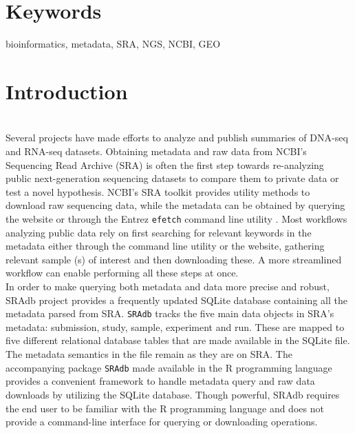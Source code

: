 \documentclass[9pt,a4paper]{extarticle}
\begin{document}
\section*{Keywords}
bioinformatics, metadata, SRA, NGS, NCBI, GEO



\clearpage
\pagestyle{main}
\section*{Introduction}
~\\
Several projects have made efforts to analyze and publish summaries of DNA-seq \cite{macarthur2012systematic} and RNA-seq
\cite{lachmann2018massive, collado2017reproducible} datasets. Obtaining metadata
and raw data from NCBI's Sequencing Read Archive (SRA) \cite{leinonen2010sequence}
is often the first step towards re-analyzing public next-generation sequencing 
datasets to compare them to private data or test a novel hypothesis. NCBI's SRA
toolkit \cite{ncbisratoolit} provides utility methods to download raw sequencing
data, while the metadata can be obtained by querying the website or through the
Entrez \texttt{efetch} command line utility \cite{kans2018entrez}. Most workflows analyzing
public data rely on first searching for relevant keywords in the metadata either
through the command line utility or the website, gathering relevant sample (s) of interest and then downloading these. A
more streamlined workflow can enable performing all these steps at once.
~\\

In order to make querying both metadata and data more precise and robust, SRAdb
\cite{zhu2013sradb} project provides a frequently updated SQLite database 
containing all the metadata parsed from SRA. \texttt{SRAdb} tracks the five main
data objects in SRA's metadata: submission, study, sample, experiment and run.
These are mapped to five different relational database tables that are made
available in the SQLite file. The metadata semantics in the file remain as they are on
SRA. The accompanying package \texttt{SRAdb} \cite{zhudavissradb} made available in the R programming language \cite{rprog}
provides a convenient framework to handle metadata query and raw data downloads by utilizing the SQLite database. 
Though powerful, SRAdb requires the end user to be familiar 
with the R programming language and does not provide a command-line interface for
querying or downloading operations.
~\\
\end{document}
